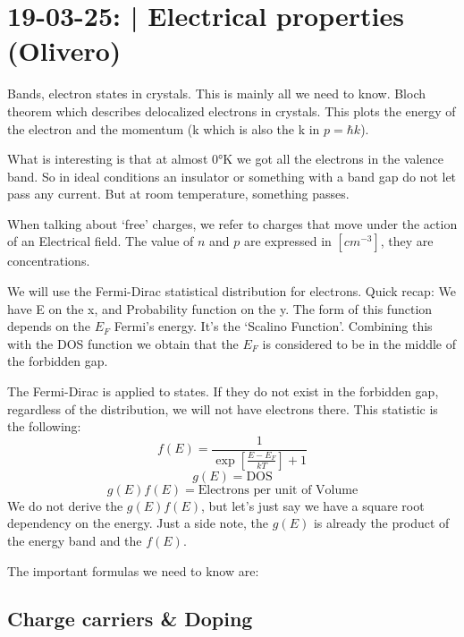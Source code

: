 \section{19-03-25: | Electrical properties (Olivero)}

Bands, electron states in crystals. This is mainly all we need to know. Bloch theorem which describes delocalized electrons in crystals. This plots the energy of the electron and the momentum (k which is also the k in $p=\hbar k$).

What is interesting is that at almost 0°K we got all the electrons in the valence band. So in ideal conditions an insulator or something with a band gap do not let pass any current. But at room temperature, something passes.

When talking about `free' charges, we refer to charges that move under the action of an Electrical field. The value of $n$ and $p$ are expressed in $[cm^{-3}]$, they are concentrations. 

We will use the Fermi-Dirac statistical distribution for electrons. Quick recap: We have E on the x, and Probability function on the y. The form of this function depends on the $E_F$ Fermi's energy. It's the `Scalino Function'. Combining this with the DOS function we obtain that the $E_F$ is considered to be in the middle of the forbidden gap.

The Fermi-Dirac is applied to states. If they do not exist in the forbidden gap, regardless of the distribution, we will not have electrons there. This statistic is the following:
\begin{equation}
    f(E) = \frac{1}{\exp\left[\frac{E - E_F}{kT}\right] + 1}
\end{equation}
\begin{equation}
    g(E) = \text{DOS}
\end{equation}
\begin{equation}
    g(E)f(E) = \text{Electrons per unit of Volume}
\end{equation}
We do not derive the $g(E)f(E)$, but let's just say we have a square root dependency on the energy. Just a side note, the $g(E)$ is already the product of the energy band and the $f(E)$.

The important formulas we need to know are:

\subsection{Charge carriers \& Doping}

